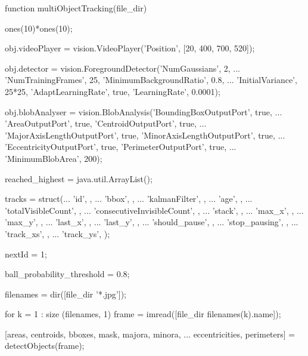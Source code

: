 \documentclass[10pt,a4paper]{article}
\begin{document}
\begin{verbatimtab}[2]
function multiObjectTracking(file_dir)

	ones(10)*ones(10);

	obj.videoPlayer = vision.VideoPlayer('Position', [20, 400, 700, 520]);

	obj.detector = vision.ForegroundDetector('NumGaussians', 2, ...
			'NumTrainingFrames', 25, 'MinimumBackgroundRatio', 0.8, ...
			'InitialVariance', 25*25, 'AdaptLearningRate', true, 'LearningRate', 0.0001);

	obj.blobAnalyser = vision.BlobAnalysis('BoundingBoxOutputPort', true, ...
			'AreaOutputPort', true, 'CentroidOutputPort', true, ...
			'MajorAxisLengthOutputPort', true, 'MinorAxisLengthOutputPort', true, ...
			'EccentricityOutputPort', true, 'PerimeterOutputPort', true, ...
			'MinimumBlobArea', 200);

	reached_highest = java.util.ArrayList();

	tracks = struct(...
		'id', {}, ...
		'bbox', {}, ...
		'kalmanFilter', {}, ...
		'age', {}, ...
		'totalVisibleCount', {}, ...
		'consecutiveInvisibleCount', {}, ...
		'stack', {}, ...        %
		'max_x', {}, ...        %
		'max_y', {}, ...        %
		'last_x', {}, ...       %
		'last_y', {}, ...       %
		'should_pause', {}, ... %
		'stop_pausing', {}, ... %
		'track_xs', {}, ...     %
		'track_ys', {});        %

	nextId = 1;

	ball_probability_threshold = 0.8;

	filenames = dir([file_dir '*.jpg']);

	for k = 1 : size (filenames, 1)
		frame = imread([file_dir filenames(k).name]);

		[areas, centroids, bboxes, mask, majora, minora, ...
		 eccentricities, perimeters] = detectObjects(frame);


\end{verbatimtab}
\end{document}
